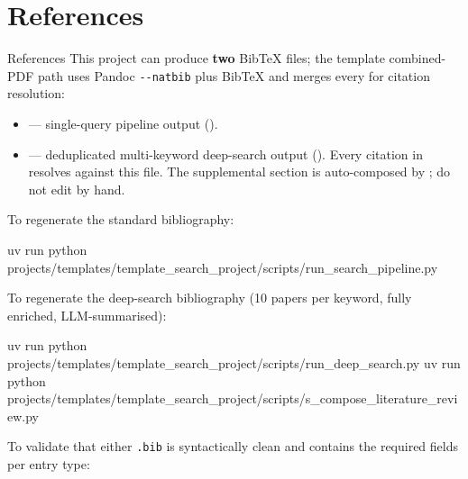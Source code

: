 \documentclass[
  ignorenonframetext,
]{beamer}
\author{\texorpdfstring{}{}}
\date{}
\newenvironment{Shaded}{}{}
\newcommand{\ExtensionTok}[1]{#1}
\newcommand{\NormalTok}[1]{#1}
\providecommand{\tightlist}{%
  \setlength{\itemsep}{0pt}\setlength{\parskip}{0pt}}
\begin{document}
\section{References}\label{sec:references}

\begin{frame}{References}
This project can produce \textbf{two} BibTeX files; the template
combined-PDF path uses Pandoc \texttt{-\/-natbib} plus BibTeX and merges
every  for citation resolution:

\begin{itemize}
\tightlist
\item
  \href{references.bib}{} ---
  single-query pipeline output
  ().
\item
  \href{references_deep.bib}{}
  --- deduplicated multi-keyword deep-search output
  (). Every citation in
   resolves against this file. The
  supplemental section is auto-composed by
  ; do not edit by
  hand.
\end{itemize}

To regenerate the standard bibliography:

\begin{Shaded}
\begin{Highlighting}[]
\ExtensionTok{uv}\NormalTok{ run python projects/templates/template\_search\_project/scripts/run\_search\_pipeline.py}
\end{Highlighting}
\end{Shaded}

To regenerate the deep-search bibliography (10 papers per keyword, fully
enriched, LLM-summarised):

\begin{Shaded}
\begin{Highlighting}[]
\ExtensionTok{uv}\NormalTok{ run python projects/templates/template\_search\_project/scripts/run\_deep\_search.py}
\ExtensionTok{uv}\NormalTok{ run python projects/templates/template\_search\_project/scripts/s\_compose\_literature\_review.py}
\end{Highlighting}
\end{Shaded}

To validate that either \texttt{.bib} is syntactically clean and
contains the required fields per entry type:


\end{frame}
\end{document}
